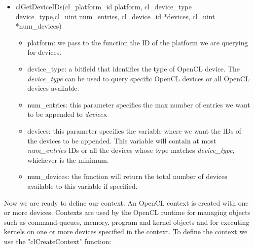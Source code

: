 \documentclass[titlepage]{article}
\begin{document}
\begin{itemize}
    \item clGetDeviceIDs(cl\_platform\_id platform, cl\_device\_type device\_type,\newline cl\_uint num\_entries, cl\_device\_id *devices, cl\_uint *num\_devices)
    \begin{itemize}
        \item platform: we pass to the function the ID of the platform we are querying for devices.
        \item device\_type: a bitfield that identifies the type of OpenCL device. The \textit{device\_type} can be used to query specific OpenCL devices or all OpenCL devices available.
        \item num\_entries: this parameter specifies the max number of entries we want to be appended to \textit{devices}.
        \item devices: this parameter specifies the variable where we want the IDs of the devices to be appended. This variable will contain at most \textit{num\_entries} IDs or all the devices whose type matches \textit{device\_type}, whichever is the minimum.
        \item num\_devices: the function will return the total number of devices available to this variable if specified.
    \end{itemize}
\end{itemize}

Now we are ready to define our context. An OpenCL context is created with one or more devices. Contexts are used by the OpenCL runtime for managing objects such as command-queues, memory, program and kernel objects and for executing kernels on one or more devices specified in the context. To define the context we use the "clCreateContext" function:
\end{document}
